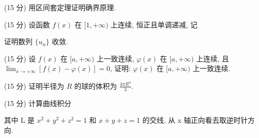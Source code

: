 \par{}
(15 分) 用区间套定理证明确界原理.\par
\par{}
\par{}
(15 分) 设函数 $f(x)$ 在 $[1, +\infty)$ 上连续, 恒正且单调递减, 记\par
\nopagebreak[4]
证明数列 $\{u_n\}$ 收敛.\par
\par{}
(15 分) 设 $f(x)$ 在 $[a, +\infty)$ 上一致连续, $\varphi(x)$ 在 $[a, +\infty)$ 上连续, 且 $\lim_{x \to +\infty} [f(x) - \varphi(x)] = 0$, 证明: $\varphi(x)$ 在 $[a, +\infty)$ 上一致连续.\par
\par{}
(15 分) 证明半径为 $R$ 的球的体积为 $\frac{4\pi R^3}{3}$.\par
\par{}
\par{}
(15 分) 计算曲线积分\par
\nopagebreak[4]
其中 L 是  $x^{2} + y^{2} + z^{2} = 1$  和  $x + y + z = 1$  的交线, 从 x 轴正向看去取逆时针方向.\par
